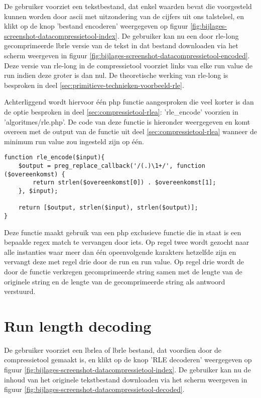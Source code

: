 De gebruiker voorziet een tekstbestand, dat enkel waarden bevat die voorgesteld kunnen worden door \gls{ascii} met uitzondering van de cijfers uit ons talstelsel, en klikt op de knop 'bestand encoderen' weergegeven op figuur \ref{fig:bijlages-screenshot-datacompressietool-index}. De gebruiker kan nu een door \gls{rle-long} gecomprimeerde \gls{lbrle} versie van de tekst in dat bestand downloaden via het scherm weergeven in figuur \ref{fig:bijlages-screenshot-datacompressietool-encoded}. Deze versie van \gls{rle-long} in de \gls{compressietool} voorziet links van elke run value de run indien deze groter is dan nul. De theoretische werking van \gls{rle-long} is besproken in deel \ref{sec:primitieve-technieken-voorbeeld-rle}.

Achterliggend wordt hiervoor één \gls{php} functie aangesproken die veel korter is dan de optie besproken in deel \ref{sec:compressietool-rlea}: 'rle\_encode' voorzien in 'algoritmes/rle.php'. De code van deze functie is hieronder weergegeven en komt overeen met de output van de functie uit deel \ref{sec:compressietool-rlea} wanneer de minimum run value zou ingesteld zijn op één.

\begin{lstlisting}
function rle_encode($input){
	$output = preg_replace_callback('/(.)\1+/', function ($overeenkomst) {
		return strlen($overeenkomst[0]) . $overeenkomst[1];
	}, $input);
	
	return [$output, strlen($input), strlen($output)];
}
\end{lstlisting}

Deze functie maakt gebruik van een \gls{php} exclusieve functie die in staat is een bepaalde \gls{regex} match te vervangen door iets. Op regel twee wordt gezocht naar alle instanties waar meer dan één opeenvolgende karakters hetzelfde zijn en vervangt deze met regel drie door de run en run value. Op regel drie wordt de door de functie verkregen gecomprimeerde \gls{string} samen met de lengte van de originele \gls{string} en de lengte van de gecomprimeerde \gls{string} als antwoord verstuurd.

\section{Run length decoding}
\label{sec:compressietool-rle-decoding}

De gebruiker voorziet een \gls{lbrlea} of \gls{lbrle} bestand, dat voordien door de \gls{compressietool} gemaakt is, en klikt op de knop 'RLE decoderen' weergegeven op figuur \ref{fig:bijlages-screenshot-datacompressietool-index}. De gebruiker kan nu de inhoud van het originele tekstbestand downloaden via het scherm weergeven in figuur \ref{fig:bijlages-screenshot-datacompressietool-decoded}.

